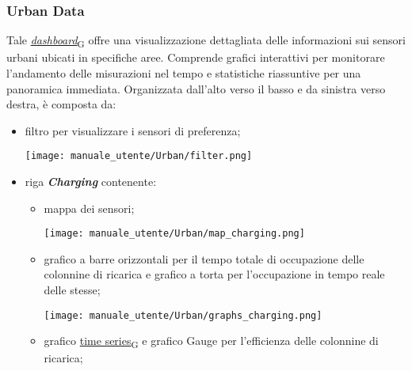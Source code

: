 \subsubsection{Urban Data}
Tale \href{https://7last.github.io/docs/pb/documentazione-interna/glossario\#dashboard}{\textit{dashboard}\textsubscript{G}} offre una visualizzazione dettagliata delle informazioni sui sensori urbani ubicati in specifiche aree. Comprende grafici interattivi per monitorare l'andamento delle misurazioni nel tempo e statistiche riassuntive per una panoramica immediata. Organizzata dall'alto verso il basso e da sinistra verso destra, è composta da:
\begin{itemize}
    \item filtro per visualizzare i sensori di preferenza;
    \begin{center}
        \texttt{[image: manuale\_utente/Urban/filter.png]}
    \end{center}
    \item riga \textit{\textbf{Charging}} contenente:
    \begin{itemize}
        \item mappa dei sensori;
        \begin{center}
            \texttt{[image: manuale\_utente/Urban/map\_charging.png]}
        \end{center}
        \item grafico a barre orizzontali per il tempo totale di occupazione delle colonnine di ricarica e grafico a torta per l'occupazione in tempo reale delle stesse;
        \begin{center}
            \texttt{[image: manuale\_utente/Urban/graphs\_charging.png]}
        \end{center}
        \item grafico \href{https://7last.github.io/docs/pb/documentazione-interna/glossario\#time-series}{time series\textsubscript{G}} e grafico Gauge per l'efficienza delle colonnine di ricarica;

\end{itemize}
\end{itemize}
